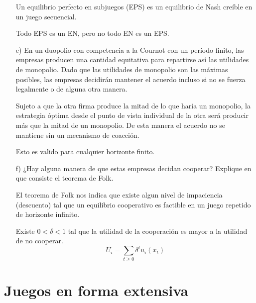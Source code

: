 \documentclass{exam}
\begin{document}
\begin{itemize}
\begin{solution}
        Un equilibrio perfecto en subjuegos (EPS) es un equilibrio de Nash creíble en un juego secuencial. 

        Todo EPS es un EN, pero no todo EN es un EPS. 
    \end{solution} 
    
    \item[e)] En un duopolio con competencia a la Cournot con un período finito, las empresas producen una cantidad equitativa para repartirse así las utilidades de monopolio. Dado que las utilidades de monopolio son las máximas posibles, las empresas decidirán mantener el acuerdo incluso si no se fuerza legalmente o de alguna otra manera. 
    \begin{solution}
        Sujeto a que la otra firma produce la mitad de lo que haría un monopolio, la estrategia óptima desde el punto de vista individual de la otra será producir más que la mitad de un monopolio. De esta manera el acuerdo no se mantiene sin un mecanismo de coacción. 

        Esto es valido para cualquier horizonte finito.
    \end{solution}
    \item[f)] ¿Hay alguna manera de que estas empresas decidan cooperar? Explique en que consiste el teorema de Folk.
    \begin{solution}
        El teorema de Folk nos indica que existe algun nivel de impaciencia (descuento) tal que un equilibrio cooperativo es factible en un juego repetido de horizonte infinito.

        Existe $0<\delta < 1$ tal que la utilidad de la cooperación es mayor a la utilidad de no cooperar.
        \begin{equation*}
            U_i = \sum_{t\geq 0} \delta^t u_i(x_t)
        \end{equation*}
    \end{solution}
\end{itemize}

\section{Juegos en forma extensiva}
\end{document}
